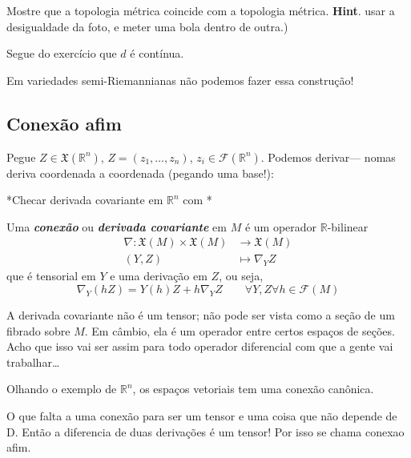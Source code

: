 \begin{exercise}\leavevmode
Mostre que a topologia métrica coincide com a topologia métrica. \textbf{Hint}. usar a desigualdade da foto, e meter uma bola dentro de outra.)
\end{exercise}

Segue do exercício 	que \(d\) é contínua.

\begin{remark}\leavevmode
Em variedades semi-Riemannianas não podemos fazer essa construção!
\end{remark}

\subsection{Conexão afim}

Pegue \(Z \in \mathfrak{X}(\mathbb{R}^n)\), \(Z=(z_1,\ldots,z_n)\), \(z_i \in \mathcal{F}(\mathbb{R}^n)\). Podemos derivar--- nomas deriva coordenada a coordenada {\color{7}(pegando uma  base!)}:

*Checar derivada covariante em \(\mathbb{R}^n\) com \cite{tud}*

\begin{defn}\leavevmode
Uma \textit{\textbf{conexão}} ou \textit{\textbf{derivada covariante}} em \(M\) é um operador \(\mathbb{R}\)-bilinear
\begin{align*}
	\nabla: \mathfrak{X}(M) \times \mathfrak{X}(M) &\longrightarrow \mathfrak{X}(M) \\
	(Y,Z) &\longmapsto \nabla_YZ
\end{align*}
que é tensorial em \(Y\) e uma derivação em \(Z\), ou seja,
\[\nabla_Y(hZ)=Y(h)Z+h\nabla_YZ\qquad  \forall  Y,Z \forall h \in \mathcal{F}(M)\]
\end{defn}

\begin{remark}[dani]\leavevmode
A derivada covariante não é um tensor; não pode ser vista como a seção de um fibrado sobre \(M\). Em câmbio, ela é um operador entre certos espaços de seções. Acho que isso vai ser assim para todo operador diferencial com que a gente vai trabalhar…
\end{remark}

Olhando o exemplo de \(\mathbb{R}^n\), os espaços vetoriais tem uma conexão canônica.

O que falta a uma conexão para ser um tensor e uma coisa que não depende de D. Então a diferencia de duas derivações é um tensor! Por isso se chama conexao afim.

